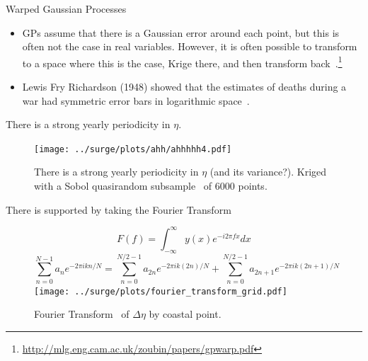 \documentclass[usenames, dvipsnames]{beamer}
\begin{document}
\begin{frame}{Warped Gaussian Processes}
\begin{itemize}
\item GPs assume that there is a Gaussian error around each point, but this is often not the case in real variables.
However, it is often possible to transform to a space where this is the case, Krige there,
 and then transform back~\cite{snelson2004warped}.\footnote{\url{http://mlg.eng.cam.ac.uk/zoubin/papers/gpwarp.pdf}}
 \item Lewis Fry Richardson (1948) showed that the estimates of deaths during a war had
 symmetric error bars in logarithmic space~\cite{richardson1948variation}.
 \end{itemize}
\end{frame}


\begin{frame}{There is a strong yearly periodicity in $\eta$. }
\vspace{-20pt}
\begin{figure}[htb!]
    \centering
    \texttt{[image: ../surge/plots/ahh/ahhhhh4.pdf]}
    \vspace{-7pt}
    \caption{There is a strong yearly periodicity in $\eta$ (and its variance?).
     Kriged with a Sobol quasirandom subsample~\cite{sobol1967distribution} of 6000 points.}
\end{figure}
\end{frame}


\begin{frame}{There is  supported by taking the Fourier Transform }
\vspace{-40pt}
\begin{figure}[htb!]
    \centering
    \begin{equation}
F(f)=\int_{-\infty}^{\infty} y(x) e^{-i 2\pi f x} d x
\end{equation}
\begin{equation}
\sum_{n=0}^{N-1} a_{n} e^{-2 \pi i  k n/ N}=\sum_{n=0}^{N / 2-1} a_{2 n}
e^{-2 \pi i k (2 n)/ N} +\sum_{n=0}^{N / 2-1} a_{2n+1} e^{-2 \pi i k (2 n+1)/ N}
\end{equation}
    \texttt{[image: ../surge/plots/fourier\_transform\_grid.pdf]}
    \vspace{-7pt}
    \caption{Fourier Transform~\cite{cooley1965algorithm} of $\Delta\eta$ by coastal point.}
\end{figure}
\end{frame}
\end{document}
